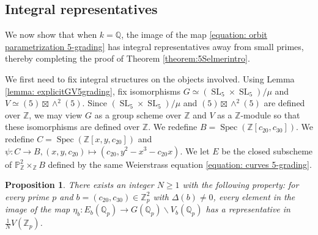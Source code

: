 \documentclass{article} %
\newtheorem{proposition}{Proposition}[section]
\numberwithin{equation}{section}
\theoremstyle{definition}
\DeclareMathOperator{\SL}{SL}
\DeclareMathOperator{\Spec}{Spec}
\renewcommand{\P}{\mathbb{P}}
\newcommand{\Q}{\mathbb{Q}}
\newcommand{\Z}{\mathbb{Z}}
\begin{document}
\subsection{Integral representatives}


We now show that when $k=\Q$, the image of the map \eqref{equation: orbit parametrization 5-grading} has integral representatives away from small primes, thereby completing the proof of Theorem \ref{theorem:5Selmerintro}.

We first need to fix integral structures on the objects involved.
Using Lemma \ref{lemma: explicitGV5grading}, fix isomorphisms $G\simeq (\SL_5\times \SL_5)/\mu$ and $V\simeq (5) \boxtimes \wedge^2(5)$.
Since $(\SL_5\times \SL_5)/\mu$ and $(5) \boxtimes \wedge^2(5)$ are defined over $\Z$, we may view $G$ as a group scheme over $\Z$ and $V$ as a $\Z$-module so that these isomorphisms are defined over $\Z$.
We redefine $B = \Spec(\Z[c_{20},c_{30}])$.
We redefine $C = \Spec(\Z[x,y,c_{20}])$ and $\psi\colon C\rightarrow B, (x,y,c_{20})\mapsto (c_{20}, y^2 - x^3-c_{20}x)$.
We let $E$ be the closed subscheme of $\P^2_{\Z} \times_{\Z} B$ defined by the same Weierstrass equation \eqref{equation: curves 5-grading}.


\begin{proposition}\label{proposition: local integral representatives}
    There exists an integer $N\geq 1$ with the following property:
    for every prime $p$ and $b = (c_{20}, c_{30})\in \Z_p^2$ with $\Delta(b)\neq 0$, every element in the image of the map $\eta_b\colon E_b(\Q_p) \rightarrow G(\Q_p)\backslash V_b(\Q_p)$
    has a representative in $\frac{1}{N}V(\Z_p)$.
\end{proposition}
\end{document}
